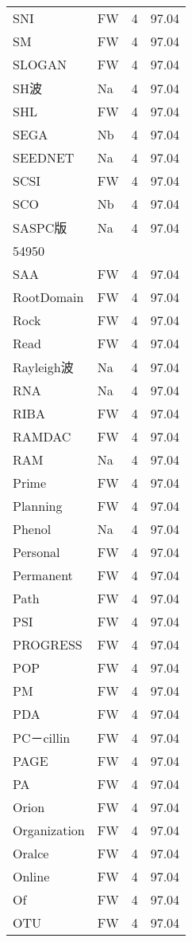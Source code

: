 \documentclass[twocolumn]{book}
\begin{document}
\begin{supertabular}{llrr}
SNI & FW & 4 &  97.04\\
SM & FW & 4 &  97.04\\
SLOGAN & FW & 4 &  97.04\\
SH波 & Na & 4 &  97.04\\
SHL & FW & 4 &  97.04\\
SEGA & Nb & 4 &  97.04\\
SEEDNET & Na & 4 &  97.04\\
SCSI & FW & 4 &  97.04\\
SCO & Nb & 4 &  97.04\\
SASPC版 & Na & 4 &  97.04\\
54950\\
SAA & FW & 4 &  97.04\\
RootDomain & FW & 4 &  97.04\\
Rock & FW & 4 &  97.04\\
Read & FW & 4 &  97.04\\
Rayleigh波 & Na & 4 &  97.04\\
RNA & Na & 4 &  97.04\\
RIBA & FW & 4 &  97.04\\
RAMDAC & FW & 4 &  97.04\\
RAM & Na & 4 &  97.04\\
Prime & FW & 4 &  97.04\\
Planning & FW & 4 &  97.04\\
Phenol & Na & 4 &  97.04\\
Personal & FW & 4 &  97.04\\
Permanent & FW & 4 &  97.04\\
Path & FW & 4 &  97.04\\
PSI & FW & 4 &  97.04\\
PROGRESS & FW & 4 &  97.04\\
POP & FW & 4 &  97.04\\
PM & FW & 4 &  97.04\\
PDA & FW & 4 &  97.04\\
PC－cillin & FW & 4 &  97.04\\
PAGE & FW & 4 &  97.04\\
PA & FW & 4 &  97.04\\
Orion & FW & 4 &  97.04\\
Organization & FW & 4 &  97.04\\
Oralce & FW & 4 &  97.04\\
Online & FW & 4 &  97.04\\
Of & FW & 4 &  97.04\\
OTU & FW & 4 &  97.04\\

\end{supertabular}
\end{document}

